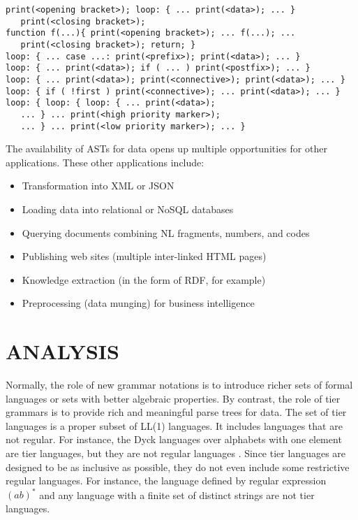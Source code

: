 \documentclass{llncs}
\begin{document}
\begin{small}
\begin{verbatim}
print(<opening bracket>); loop: { ... print(<data>); ... } 
   print(<closing bracket>);
function f(...){ print(<opening bracket>); ... f(...); ... 
   print(<closing bracket>); return; }	
loop: { ... case ...: print(<prefix>); print(<data>); ... }	
loop: { ... print(<data>); if ( ... ) print(<postfix>); ... }	 
loop: { ... print(<data>); print(<connective>); print(<data>); ... }
loop: { if ( !first ) print(<connective>); ... print(<data>); ... }
loop: { loop: { loop: { ... print(<data>); 
   ... } ... print(<high priority marker>); 
   ... } ... print(<low priority marker>); ... }
\end{verbatim}
\end{small}

The availability of ASTs for data opens up multiple opportunities for other applications. These other applications include:

\begin{itemize}
\item Transformation into XML or JSON

\item Loading data into relational or NoSQL databases

\item Querying documents combining NL fragments, numbers, and codes

\item Publishing web sites (multiple inter-linked HTML pages)

\item Knowledge extraction (in the form of RDF, for example)

\item Preprocessing (data munging) for business intelligence 
\end{itemize}

\section{\uppercase{Analysis}}

Normally, the role of new grammar notations is to introduce richer sets of formal languages or sets with better algebraic properties. By contrast, the role of tier grammars is to provide rich and meaningful parse trees for data. The set of tier languages is a proper subset of LL(1) languages. It includes languages that are not regular. For instance, the Dyck languages over alphabets with one element are tier languages, but they are not regular languages \cite{Berstel02}. Since tier languages are designed to be as inclusive as possible, they do not even include some restrictive regular languages. For instance, the language defined by regular expression $(ab)^*$ and any language with a finite set of distinct strings are not tier languages.  
\end{document}
